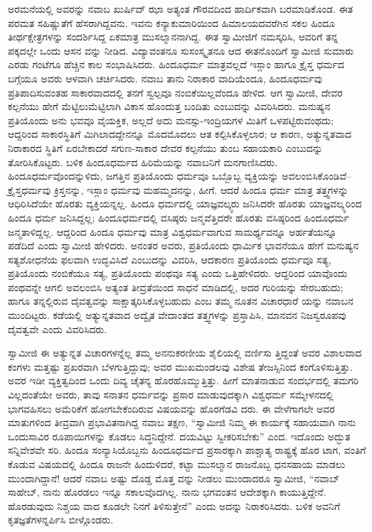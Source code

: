 ಅರಮನೆಯಲ್ಲಿ ಅವರನ್ನು ನವಾಬ ಖುರ್ಷಿದ್ ಝಾ ಅತ್ಯಂತ ಗೌರವದಿಂದ ಹಾರ್ದಿಕವಾಗಿ ಬರಮಾಡಿಕೊಂಡ. ಈತ ಪರಮತ ಸಹಿಷ್ಣುತೆಗೆ ಹೆಸರಾಗಿದ್ದವನು. ಇವನು ಕನ್ಯಾಕುಮಾರಿಯಿಂದ ಹಿಮಾಲಯದವರೆಗಿನ ಸಕಲ ಹಿಂದೂ ತೀರ್ಥಕ್ಷೇತ್ರಗಳನ್ನು ಸಂದರ್ಶಿಸಿದ್ದ ಏಕಮಾತ್ರ ಮುಸಲ್ಮಾನನಾಗಿದ್ದ. ಈತ ಸ್ವಾಮೀಜಿಗೆ ನಮಸ್ಕರಿಸಿ, ಅವರಿಗೆ ತನ್ನ ಪಕ್ಕದಲ್ಲೇ ಒಂದು ಆಸನ ವನ್ನು ನೀಡಿದ. ವಿದ್ಯಾವಂತನೂ ಸುಸಂಸ್ಕೃತನೂ ಆದ ಈತನೊಂದಿಗೆ ಸ್ವಾಮೀಜಿ ಸುಮಾರು ಎರಡು ಗಂಟೆಗೂ ಹೆಚ್ಚಿನ ಕಾಲ ಸಂಭಾಷಿಸಿದರು. ಹಿಂದೂಧರ್ಮ ಮಾತ್ರವಲ್ಲದೆ ಇಸ್ಲಾಂ ಹಾಗೂ ಕ್ರೈಸ್ತ ಧರ್ಮದ ಬಗ್ಗೆಯೂ ಅವರು ಆಳವಾಗಿ ಚರ್ಚಿಸಿದರು. ನವಾಬ ತಾನು ನಿರಾಕಾರ ವಾದಿಯೆಂದೂ, ಹಿಂದೂಧರ್ಮವು ಪ್ರತಿಪಾದಿಸುವಂತಹ ಸಾಕಾರವಾದದಲ್ಲಿ ತನಗೆ ಸ್ವಲ್ಪವೂ ನಂಬಿಕೆಯಿಲ್ಲವೆಂದೂ ಹೇಳಿದ. ಆಗ ಸ್ವಾಮೀಜಿ, ದೇವರ ಕಲ್ಪನೆಯು ಹೇಗೆ ಮೆಟ್ಟಿಲುಮೆಟ್ಟಿಲಾಗಿ ವಿಕಾಸ ಹೊಂದುತ್ತ ಬಂದಿತು ಎಂಬುದನ್ನು ವಿವರಿಸಿದರು. ಮನುಷ್ಯನ ಪ್ರತಿಯೊಂದು ಅನು ಭವವೂ ವೈಯಕ್ತಿಕ, ಅಲ್ಲದೆ ಅದು ಮನಸ್ಸು-ಇಂದ್ರಿಯಗಳ ಮಿತಿಗೆ ಒಳಪಟ್ಟಿರುವಂಥದು; ಆದ್ದರಿಂದ ಸಾಕಾರಸ್ಥಿತಿಗೆ ಮಿಗಿಲಾದದ್ದೇನನ್ನೂ ಮೊದಮೊದಲು ಆತ ಕಲ್ಪಿಸಿಕೊಳ್ಳಲಾರ; ಆ ಕಾರಣ, ಅತ್ಯುನ್ನತವಾದ ನಿರಾಕಾರದ ಸ್ಥಿತಿಗೆ ಏರಬೇಕಾದರೆ ಸಗುಣ-ಸಾಕಾರ ದೇವರ ಕಲ್ಪನೆಯು ತುಂಬ ಸಹಾಯಕಾರಿ ಎಂಬುದನ್ನು ತೋರಿಸಿಕೊಟ್ಟರು. ಬಳಿಕ ಹಿಂದೂಧರ್ಮದ ಹಿರಿಮೆಯನ್ನು ನವಾಬನಿಗೆ ಮನಗಾಣಿಸಿದರು. ಹಿಂದೂಧರ್ಮವೊಂದನ್ನುಳಿದು, ಜಗತ್ತಿನ ಪ್ರತಿಯೊಂದು ಧರ್ಮವೂ ಒಬ್ಬೊಬ್ಬ ವ್ಯಕ್ತಿಯನ್ನು ಅವಲಂಬಿಸಿಕೊಂಡಿವೆ–ಕ್ರೈಸ್ತಧರ್ಮವು ಕ್ರಿಸ್ತನನ್ನು, ಇಸ್ಲಾಂ ಧರ್ಮವು ಮಹಮ್ಮದನನ್ನು, ಹೀಗೆ. ಆದರೆ ಹಿಂದೂ ಧರ್ಮ ಮಾತ್ರ ತತ್ತ್ವಗಳನ್ನು ಆಧಿರಿಸಿದೆಯೇ ಹೊರತು ವ್ಯಕ್ತಿಯನ್ನಲ್ಲ. ಹಿಂದೂ ಧರ್ಮದಲ್ಲಿ ಯಾಜ್ಞವಲ್ಕ್ಯರು ಜನಿಸಿದರೇ ಹೊರತು ಯಾಜ್ಞವಲ್ಕ್ಯರಿಂದ ಹಿಂದೂ ಧರ್ಮ ಜನಿಸಿದ್ದಲ್ಲ; ಹಿಂದೂಧರ್ಮದಲ್ಲಿ ವಸಿಷ್ಠರು ಜನ್ಮವೆತ್ತಿದರೇ ಹೊರತು ವಸಿಷ್ಠರಿಂದ ಹಿಂದೂಧರ್ಮ ಜನ್ಮತಾಳಿದ್ದಲ್ಲ. ಆದ್ದರಿಂದ ಹಿಂದೂ ಧರ್ಮವು ಮಾತ್ರ ವಿಶ್ವಧರ್ಮವಾಗುವ ಸಾಮರ್ಥ್ಯವನ್ನೂ ಅರ್ಹತೆಯನ್ನೂ ಪಡೆದಿದೆ ಎಂದು ಸ್ವಾಮೀಜಿ ಹೇಳಿದರು. ಅನಂತರ ಅವರು, ಪ್ರತಿಯೊಂದು ಧಾರ್ಮಿಕ ಭಾವನೆಯೂ ಹೇಗೆ ಮನುಷ್ಯನ ಸತ್ಯಶೋಧನೆಯ ಫಲವಾಗಿ ಉದ್ಭವಿಸಿದೆ ಎಂಬುದನ್ನು ವಿವರಿಸಿ, ಆದಕಾರಣ ಪ್ರತಿಯೊಂದು ಧರ್ಮವೂ ಸತ್ಯ, ಪ್ರತಿಯೊಂದು ನಂಬಿಕೆಯೂ ಸತ್ಯ, ಪ್ರತಿಯೊಂದು ಪಂಥವೂ ಸತ್ಯ ಎಂದು ಒತ್ತಿಹೇಳಿದರು. ಆದ್ದರಿಂದ ಯಾವೊಂದು ಪಂಥವನ್ನೇ ಆಗಲಿ ಅವಲಂಬಿಸಿ ಅತ್ಯಂತ ತೀವ್ರತೆಯಿಂದ ಸಾಧನೆ ಮಾಡಿದಲ್ಲಿ, ಅದರ ಗುರಿಯನ್ನು ಸೇರಬಹುದು; ಹಾಗೂ ತನ್ನಲ್ಲಿರುವ ದೈವತ್ವವನ್ನು ಸಾಕ್ಷಾತ್ಕರಿಸಿಕೊಳ್ಳಬಹುದು ಎಂಬ ತಮ್ಮ ನೂತನ ವಿಚಾರಧಾರೆ ಯನ್ನು ನವಾಬನ ಮುಂದಿಟ್ಟರು. ಕಡೆಯಲ್ಲಿ ಅತ್ಯುನ್ನತವಾದ ಅದ್ವೈತ ವೇದಾಂತದ ತತ್ತ್ವಗಳನ್ನು ಪ್ರಸ್ತಾಪಿಸಿ, ಮಾನವನ ನಿಜಸ್ವರೂಪವು ದೈವತ್ವವೇ ಎಂದು ವಿವರಿಸಿದರು.

ಸ್ವಾಮೀಜಿ ಈ ಅತ್ಯುನ್ನತ ವಿಚಾರಗಳನ್ನೆಲ್ಲ ತಮ್ಮ ಅನನುಕರಣೀಯ ಶೈಲಿಯಲ್ಲಿ ವರ್ಣಿಸು ತ್ತಿದ್ದಂತೆ ಅವರ ವಿಶಾಲವಾದ ಕಂಗಳು ಮತ್ತಷ್ಟು ಪ್ರಖರವಾಗಿ ಬೆಳಗುತ್ತಿದ್ದುವು; ಅವರ ಮುಖಮಂಡಲವು ವಿಶೇಷ ತೇಜಸ್ಸಿನಿಂದ ಕಂಗೊಳಿಸುತ್ತಿತ್ತು. ಅವರ ಇಡೀ ವ್ಯಕ್ತಿತ್ವದಿಂದ ಒಂದು ದಿವ್ಯ ಚೈತನ್ಯ ಹೊರಹೊಮ್ಮುತ್ತಿತ್ತು. ಹೀಗೆ ಮಾತನಾಡುವ ಸಂದರ್ಭದಲ್ಲಿ ತಮಗರಿ ವಿಲ್ಲದಂತೆಯೇ ಅವರು, ತಾವು ಸನಾತನ ಧರ್ಮವನ್ನು ಪ್ರಸಾರ ಮಾಡುವುದಕ್ಕಾಗಿ ವಿಶ್ವಧರ್ಮ ಸಮ್ಮೇಳನದಲ್ಲಿ ಭಾಗವಹಿಸಲು ಅಮೆರಿಕೆಗೆ ಹೋಗಬೇಕೆಂದಿರುವ ವಿಷಯವನ್ನು ಹೊರಗೆಡವಿ ದರು. ಈ ವೇಳೆಗಾಗಲೇ ಅವರ ಮಾತುಗಳಿಂದ ತೀವ್ರವಾಗಿ ಪ್ರಭಾವಿತನಾಗಿದ್ದ ನವಾಬ ತಕ್ಷಣ, “ಸ್ವಾಮೀಜಿ ನಿಮ್ಮ ಈ ಕಾರ್ಯಕ್ಕೆ ಸಹಾಯವಾಗಿ ನಾನು ಒಂದುಸಾವಿರ ರೂಪಾಯಿಗಳನ್ನು ಕೊಡಲು ಸಿದ್ಧನಿದ್ದೇನೆ. ದಯವಿಟ್ಟು ಸ್ವೀಕರಿಸಬೇಕು” ಎಂದ. ಇದೊಂದು ಅದ್ಭುತ ಸನ್ನಿವೇಶವೇ ಸರಿ. ಹಿಂದೂ ಸಂನ್ಯಾಸಿಯೊಬ್ಬನು ಹಿಂದೂಧರ್ಮದ ಪ್ರಸಾರಕ್ಕಾಗಿ ಪಾಶ್ಚಾತ್ಯ ರಾಷ್ಟ್ರಕ್ಕೆ ಹೊರ ಟಾಗ, ವಂತಿಗೆ ಕೊಡುವ ವಿಷಯದಲ್ಲಿ ಹಿಂದೂ ರಾಜನೇ ಹಿಂದುಳಿದರೆ, ಕಟ್ಟಾ ಮುಸಲ್ಮಾನ ರಾಜನೊಬ್ಬ ಧನಸಹಾಯ ಮಾಡಲು ಮುಂದಾಗಿದ್ದಾನೆ! ಆದರೆ ನವಾಬ ಅಷ್ಟು ದೊಡ್ಡ ಮೊತ್ತ ವನ್ನು ನೀಡಲು ಮುಂದಾದರೂ ಸ್ವಾಮೀಜಿ, “ನವಾಬ್ ಸಾಹೇಬ್, ನಾನು ಹೊರಡಲು ಇನ್ನೂ ಸಕಾಲವೊದಗಿಲ್ಲ. ನಾನು ಭಗವಂತನ ಆದೇಶಕ್ಕಾಗಿ ಕಾಯುತ್ತಿದ್ದೇನೆ. ಹೊರಡುವುದು ನಿಶ್ಚಯ ವಾದ ಕೂಡಲೇ ನಿನಗೆ ತಿಳಿಸುತ್ತೇನೆ” ಎಂದು ಅದನ್ನು ನಿರಾಕರಿಸಿದರು. ಬಳಿಕ ಅವನಿಗೆ ಕೃತಜ್ಞತೆಗಳನ್ನರ್ಪಿಸಿ ಬೀಳ್ಗೊಂಡರು.

